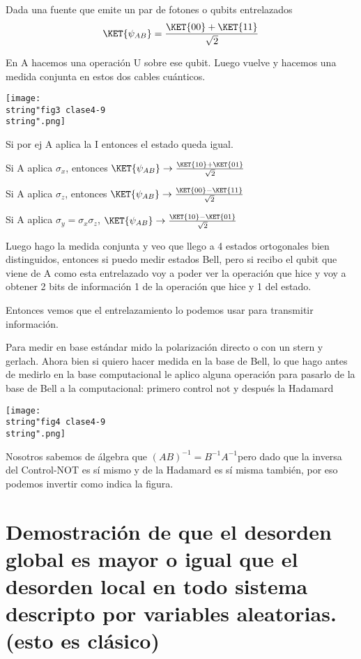 Dada una fuente que emite un par de fotones o qubits entrelazados
\[
\KET{\psi_{AB}}=\frac{\KET{00}+\KET{11}}{\sqrt{2}}
\]

En A hacemos una operación U sobre ese qubit. Luego vuelve y hacemos
una medida conjunta en estos dos cables cuánticos.
\begin{center}
\texttt{[image: \\string"fig3 clase4-9\\string".png]}
\par\end{center}

Si por ej A aplica la I entonces el estado queda igual. 

Si A aplica $\sigma_{x}$, entonces $\KET{\psi_{AB}}\rightarrow\frac{\KET{10}+\KET{01}}{\sqrt{2}}$

Si A aplica $\sigma_{z}$, entonces $\KET{\psi_{AB}}\rightarrow\frac{\KET{00}-\KET{11}}{\sqrt{2}}$

Si A aplica $\sigma_{y}=\sigma_{x}\sigma_{z}$, $\KET{\psi_{AB}}\rightarrow\frac{\KET{10}-\KET{01}}{\sqrt{2}}$

Luego hago la medida conjunta y veo que llego a 4 estados ortogonales
bien distinguidos, entonces si puedo medir estados Bell, pero si recibo
el qubit que viene de A como esta entrelazado voy a poder ver la operación
que hice y voy a obtener 2 bits de información 1 de la operación que
hice y 1 del estado.

Entonces vemos que el entrelazamiento lo podemos usar para transmitir
información. 

Para medir en base estándar mido la polarización directo o con un
stern y gerlach. Ahora bien si quiero hacer medida en la base de Bell,
lo que hago antes de medirlo en la base computacional le aplico alguna
operación para pasarlo de la base de Bell a la computacional: primero
control not y después la Hadamard 
\begin{center}
\texttt{[image: \\string"fig4 clase4-9\\string".png]}
\par\end{center}

Nosotros sabemos de álgebra que $(AB)^{-1}=B^{-1}A^{-1}$pero dado
que la inversa del Control-NOT es sí mismo y de la Hadamard
es sí misma también, por eso podemos invertir como indica la figura. 


\section{Demostración de que el desorden global es mayor o igual que el desorden
local en todo sistema descripto por variables aleatorias. (esto es
clásico)}

